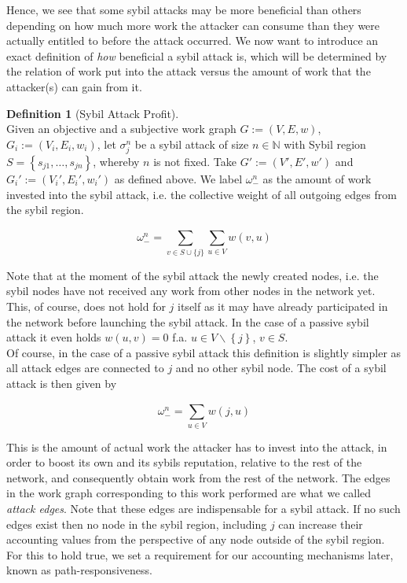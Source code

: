 \documentclass[11pt,a4paper]{report}
\theoremstyle{definition}
\newtheorem{definition}{Definition}[section]
\theoremstyle{theorem}
\theoremstyle{proposition}
\theoremstyle{corollary}
\theoremstyle{lemma}
\theoremstyle{example}
\theoremstyle{remark}
\begin{document}
\noindent{}Hence, we see that some sybil attacks may be more beneficial than others depending on how much more work the attacker can consume than they were actually entitled to before the attack occurred. We now want to introduce an exact definition of {\it how} beneficial a sybil attack is, which will be determined by the relation of work put into the attack versus the amount of work that the attacker(s) can gain from it.\vspace{1em}\\

\begin{definition}[Sybil Attack Profit]\ \\
Given an objective and a subjective work graph $G:=(V,E,w)$, $G_i:=(V_i,E_i,w_i)$, let $\sigma_j^n$ be a sybil attack of size $n\in\mathbb{N}$ with Sybil region $S=\left\lbrace{}s_{j1},\ldots,s_{jn}\right\rbrace$, whereby $n$ is not fixed. Take $G':=(V',E',w')$ and $G_i':=(V_i',E_i',w_i')$ as defined above. We label $\omega_{-}^{n}$ as the amount of work invested into the sybil attack, i.e. the collective weight of all outgoing edges from the sybil region. 

\[
\omega_{-}^{n} = \sum\limits_{v\in{S}\cup\{j\}}\sum\limits_{u\in{}V}^{}w(v,u)
\]

\noindent{}Note that at the moment of the sybil attack the newly created nodes, i.e. the sybil nodes have not received any work from other nodes in the network yet. This, of course, does not hold for $j$ itself as it may have already participated in the network before launching the sybil attack. In the case of a passive sybil attack it even holds $w(u,v)=0$ f.a. $u\in{}V\backslash{}\left\lbrace{}j\right\rbrace$, $v\in{}S$.\vspace{1em}\\

\noindent{}Of course, in the case of a passive sybil attack this definition is slightly simpler as all attack edges are connected to $j$ and no other sybil node. The cost of a sybil attack is then given by 

\[
\omega_{-}^{n} = \sum\limits_{u\in{}V}^{}w(j,u)
\]

\noindent{}This is the amount of actual work the attacker has to invest into the attack, in order to boost its own and its sybils reputation, relative to the rest of the network, and consequently obtain work from the rest of the network. The edges in the work graph corresponding to this work performed are what we called {\it attack edges}. Note that these edges are indispensable for a sybil attack. If no such edges exist then no node in the sybil region, including $j$ can increase their accounting values from the perspective of any node outside of the sybil region. For this to hold true, we set a requirement for our accounting mechanisms later, known as path-responsiveness.  \vspace{1em}\\


\end{definition}
\end{document}
